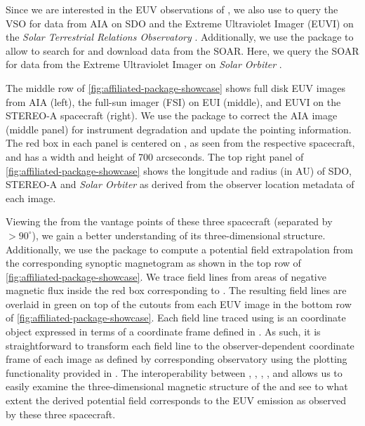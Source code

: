 Since we are interested in the EUV observations of , we also use \Fido to query the VSO for data from AIA on SDO and the Extreme Ultraviolet Imager (EUVI) on the \textit{Solar Terrestrial Relations Observatory} \citep[STEREO,][]{howard_sun_2008}.
Additionally, we use the  package to allow \Fido to search for and download data from the SOAR.
Here, we query the SOAR for data from the Extreme Ultraviolet Imager \citep[EUI,][]{rochus_solar_2020} on \textit{Solar Orbiter} \citep{muller_solar_2020}.

The middle row of \autoref{fig:affiliated-package-showcase} shows full disk EUV images from AIA (left), the full-sun imager (FSI) on EUI (middle), and EUVI on the STEREO-A spacecraft (right).
We use the \aiapypkg package to correct the AIA image (middle panel) for instrument degradation and update the pointing information.
The red box in each panel is centered on , as seen from the respective spacecraft, and has a width and height of 700 arcseconds.
The top right panel of \autoref{fig:affiliated-package-showcase} shows the \hgs longitude and radius (in AU) of SDO, STEREO-A and \textit{Solar Orbiter} as derived from the observer location metadata of each image.

Viewing the \AR from the vantage points of these three spacecraft (separated by $>90^{\circ}$), we gain a better understanding of its three-dimensional structure.
Additionally, we use the  package to compute a potential field extrapolation from the corresponding synoptic magnetogram as shown in the top row of \autoref{fig:affiliated-package-showcase}.
We trace field lines from areas of negative magnetic flux inside the red box corresponding to .
The resulting field lines are overlaid in green on top of the cutouts from each EUV image in the bottom row of \autoref{fig:affiliated-package-showcase}.
Each field line traced using  is an \astropypkg coordinate object expressed in terms of a \hgc coordinate frame defined in \sunpypkg.
As such, it is straightforward to transform each field line to the observer-dependent coordinate frame of each image as defined by corresponding observatory using the plotting functionality provided in \astropypkg.
The interoperability between \astropypkg, \sunpypkg, , \aiapypkg, and  allows us to easily examine the three-dimensional magnetic structure of the \AR and see to what extent the derived potential field corresponds to the EUV emission as observed by these three spacecraft.

